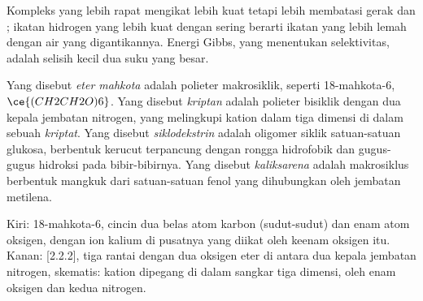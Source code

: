 Kompleks yang lebih rapat mengikat lebih kuat tetapi lebih membatasi gerak  dan
; ikatan hidrogen yang lebih kuat dengan  sering berarti ikatan yang lebih lemah dengan
air yang digantikannya. Energi Gibbs, yang menentukan selektivitas, adalah selisih kecil
dua suku yang besar.

\begin{definition}[Inang]\label{def:b3:supramolecular:hosts}
Yang disebut \emph{eter mahkota} adalah polieter makrosiklik, seperti
18-mahkota-6, $\ce{(CH2CH2O)6}$. Yang disebut \emph{kriptan} adalah polieter
bisiklik dengan dua kepala jembatan nitrogen, yang melingkupi kation dalam tiga
dimensi di dalam sebuah \emph{kriptat}. Yang disebut
\emph{siklodekstrin} adalah oligomer siklik satuan-satuan glukosa,
berbentuk kerucut terpancung dengan rongga hidrofobik dan gugus-gugus hidroksi pada
bibir-bibirnya. Yang disebut \emph{kaliksarena} adalah makrosiklus berbentuk mangkuk dari
satuan-satuan fenol yang dihubungkan oleh jembatan metilena.
\end{definition}

\begin{omfigure}

{\small Kiri: 18-mahkota-6, cincin dua belas atom karbon (sudut-sudut) dan enam atom
oksigen, dengan ion kalium di pusatnya yang diikat oleh keenam oksigen itu. Kanan:
[2.2.2], tiga rantai dengan dua oksigen eter di antara dua kepala jembatan
nitrogen, skematis: kation dipegang di dalam sangkar tiga dimensi,
oleh enam oksigen dan kedua nitrogen.}
\end{omfigure}

